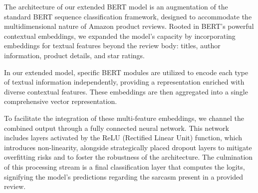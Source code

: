 \documentclass[10pt,twocolumn,letterpaper]{article}
\begin{document}
The architecture of our extended BERT model is an augmentation of the standard BERT sequence classification framework, designed to accommodate the multidimensional nature of Amazon product reviews. Rooted in BERT's powerful contextual embeddings, we expanded the model's capacity by incorporating embeddings for textual features beyond the review body: titles, author information, product details, and star ratings. 

In our extended model, specific BERT modules are utilized to encode each type of textual information independently, providing a representation enriched with diverse contextual features. These embeddings are then aggregated into a single comprehensive vector representation.

To facilitate the integration of these multi-feature embeddings, we channel the combined output through a fully connected neural network. This network includes layers activated by the ReLU (Rectified Linear Unit) function, which introduces non-linearity, alongside strategically placed dropout layers to mitigate overfitting risks and to foster the robustness of the architecture. The culmination of this processing stream is a final classification layer that computes the logits, signifying the model's predictions regarding the sarcasm present in a provided review.
\newline\newline\newline
\end{document}
